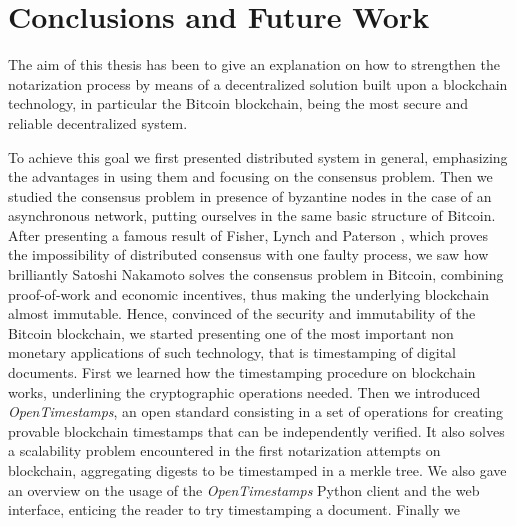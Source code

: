 \chapter{Conclusions and Future Work}
\label{chpr:conclusions}
The aim of this thesis has been to give an explanation on how to strengthen the notarization process by means of a decentralized solution built upon a blockchain technology, in particular the Bitcoin blockchain, being the most secure and reliable decentralized system.

\bigskip
\noindent
To achieve this goal we first presented distributed system in general, emphasizing the advantages in using them and focusing on the consensus problem. Then we studied the consensus problem in presence of byzantine nodes in the case of an asynchronous network, putting ourselves in the same basic structure of Bitcoin. After presenting a famous result of Fisher, Lynch and Paterson \cite{Fischer:1985:IDC:3149.214121}, which proves the impossibility of distributed consensus with one faulty process, we saw how brilliantly Satoshi Nakamoto solves the consensus problem in Bitcoin, combining proof-of-work and economic incentives, thus making the underlying blockchain almost immutable. Hence, convinced of the security and immutability of the Bitcoin blockchain, we started presenting one of the most important non monetary applications of such technology, that is timestamping of digital documents. First we learned how the timestamping procedure on blockchain works, underlining the cryptographic operations needed. Then we introduced \textit{OpenTimestamps}, an open standard consisting in a set of operations for creating provable blockchain timestamps that can be independently verified. It also solves a scalability problem encountered in the first notarization attempts on blockchain, aggregating digests to be timestamped in a merkle tree. We also gave an overview on the usage of the \textit{OpenTimestamps} Python client and the web interface, enticing the reader to try timestamping a document. Finally we 